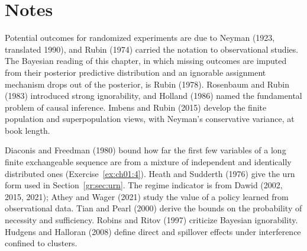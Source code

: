 \section*{Notes}

Potential outcomes for randomized experiments are due to Neyman (1923, translated 1990), and Rubin (1974) carried the notation to observational studies. The Bayesian reading of this chapter, in which missing outcomes are imputed from their posterior predictive distribution and an ignorable assignment mechanism drops out of the posterior, is Rubin (1978). Rosenbaum and Rubin (1983) introduced strong ignorability, and Holland (1986) named the fundamental problem of causal inference. Imbens and Rubin (2015) develop the finite population and superpopulation views, with Neyman's conservative variance, at book length.

Diaconis and Freedman (1980) bound how far the first few variables of a long finite exchangeable sequence are from a mixture of independent and identically distributed ones (Exercise~\ref{ex:ch01:4}). Heath and Sudderth (1976) give the urn form used in Section~\ref{gr:sec:urn}. The regime indicator is from Dawid (2002, 2015, 2021); Athey and Wager (2021) study the value of a policy learned from observational data. Tian and Pearl (2000) derive the bounds on the probability of necessity and sufficiency. Robins and Ritov (1997) criticize Bayesian ignorability. Hudgens and Halloran (2008) define direct and spillover effects under interference confined to clusters.



